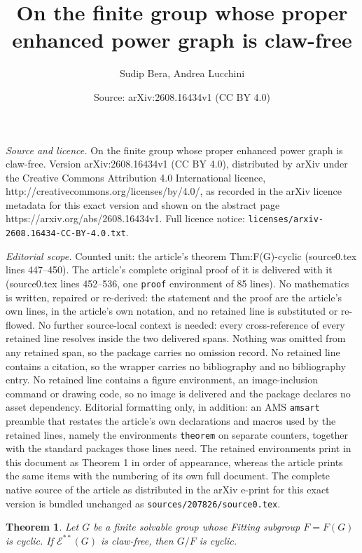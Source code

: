 \documentclass[10pt,a4paper]{amsart}
\title{On the finite group whose proper enhanced power graph is claw-free}
\author{Sudip Bera, Andrea Lucchini}
\date{Source: arXiv:2608.16434v1 (CC BY 4.0)}
\newtheorem{theorem}{Theorem}
\begin{document}
\maketitle

\noindent\emph{Source and licence.} On the finite group whose proper enhanced power graph is claw-free. Version arXiv:2608.16434v1 (CC BY 4.0), distributed by arXiv under the Creative Commons Attribution 4.0 International licence, http://creativecommons.org/licenses/by/4.0/, as recorded in the arXiv licence metadata for this exact version and shown on the abstract page https://arxiv.org/abs/2608.16434v1. Full licence notice: \texttt{licenses/arxiv-2608.16434-CC-BY-4.0.txt}.\par\smallskip

\noindent\textit{Editorial scope.} Counted unit: the article's theorem Thm:F(G)-cyclic (source0.tex lines 447--450). The article's complete original proof of it is delivered with it (source0.tex lines 452--536, one \texttt{proof} environment of 85 lines). No mathematics is written, repaired or re-derived: the statement and the proof are the article's own lines, in the article's own notation, and no retained line is substituted or re-flowed.  No further source-local context is needed: every cross-reference of every retained line resolves inside the two delivered spans.  Nothing was omitted from any retained span, so the package carries no omission record.  No retained line contains a citation, so the wrapper carries no bibliography and no bibliography entry.  No retained line contains a figure environment, an image-inclusion command or drawing code, so no image is delivered and the package declares no asset dependency.  Editorial formatting only, in addition: an AMS \texttt{amsart} preamble that restates the article's own declarations and macros used by the retained lines, namely the environments \texttt{theorem} on separate counters, together with the standard packages those lines need.  The retained environments print in this document as Theorem 1 in order of appearance, whereas the article prints the same items with the numbering of its own full document.  The complete native source of the article as distributed in the arXiv e-print for this exact version is bundled unchanged as \texttt{sources/207826/source0.tex}.
\begin{theorem}\label{Thm:F(G)-cyclic}
   Let $G$ be a finite solvable group whose Fitting subgroup $F=F(G)$ is
   cyclic.  If $\mathcal E^{**}(G)$ is claw-free, then $G/F$ is cyclic.
\end{theorem}
\end{document}
